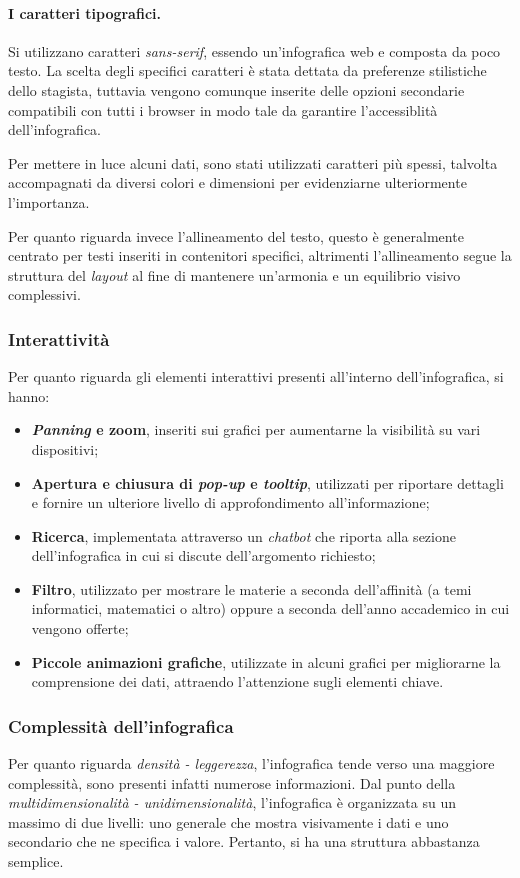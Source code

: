 \paragraph{I caratteri tipografici.} Si utilizzano caratteri \emph{sans-serif}, essendo un'infografica web e composta da poco testo. La scelta degli specifici caratteri è stata dettata da preferenze stilistiche
dello stagista, tuttavia vengono comunque inserite delle opzioni secondarie compatibili con tutti i browser in modo tale da garantire l'accessiblità dell'infografica.

Per mettere in luce alcuni dati, sono stati utilizzati caratteri più spessi, talvolta accompagnati da diversi colori e dimensioni per evidenziarne ulteriormente l'importanza.

Per quanto riguarda invece l'allineamento del testo, questo è generalmente centrato per testi inseriti in contenitori specifici, altrimenti l'allineamento segue
la struttura del \emph{layout} al fine di mantenere un'armonia e un equilibrio visivo complessivi.

\subsubsection{Interattività}
Per quanto riguarda gli elementi interattivi presenti all'interno dell'infografica, si hanno:
\begin{itemize}
    \item \textbf{\emph{Panning} e zoom}, inseriti sui grafici per aumentarne la visibilità su vari dispositivi;
    \item \textbf{Apertura e chiusura di \emph{pop-up} e \emph{tooltip}}, utilizzati per riportare dettagli e fornire un ulteriore livello di 
    approfondimento all'informazione;
    \item \textbf{Ricerca}, implementata attraverso un \emph{chatbot} che riporta alla sezione dell'infografica in cui si discute dell'argomento richiesto; 
    \item \textbf{Filtro}, utilizzato per mostrare le materie a seconda dell'affinità (a temi informatici, matematici o altro) oppure a seconda dell'anno 
    accademico in cui vengono offerte;
    \item \textbf{Piccole animazioni grafiche}, utilizzate in alcuni grafici per migliorarne la comprensione dei dati, attraendo l'attenzione sugli elementi chiave.
\end{itemize}

\subsubsection{Complessità dell'infografica}
Per quanto riguarda \emph{densità - leggerezza}, l'infografica tende verso una maggiore complessità, sono presenti infatti numerose informazioni.
Dal punto della \emph{multidimensionalità - unidimensionalità}, l'infografica è organizzata su un massimo di due livelli: uno generale che mostra visivamente i dati e 
uno secondario che ne specifica i valore. Pertanto, si ha una struttura abbastanza semplice.

